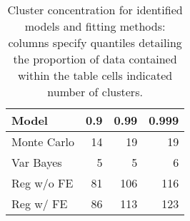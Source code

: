 \begin{table}[ht]
\centering
\begin{tabular}{lrrr}
  \hline
Model & 0.9 & 0.99 & 0.999 \\ 
  \hline
Monte Carlo & 14 & 19 & 19 \\ 
  Var Bayes & 5 & 5 & 6 \\ 
  Reg w/o FE & 81 & 106 & 116 \\ 
  Reg w/ FE & 86 & 113 & 123 \\ 
   \hline
\end{tabular}
\caption{Cluster concentration for identified models and fitting 
        methods: columns specify quantiles detailing the proportion of data 
      contained within the table cells indicated number of clusters.
      \label{tab:cluster_concentration}} 
\end{table}
